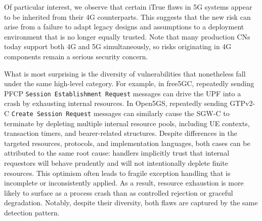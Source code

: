 Of particular interest, we observe that certain iTrue flaws in 5G systems appear to be inherited from their 4G counterparts. This suggests that the new risk can arise from a failure to adapt legacy designs and assumptions to a deployment environment that is no longer equally trusted. Note that many production CNs today support both 4G and 5G simultaneously, so risks originating in 4G components remain a serious security concern. 


What is most surprising is the diversity of vulnerabilities that nonetheless fall under the same high-level category. For example, in free5GC, repeatedly sending PFCP \texttt{Session Establishment Request} messages can drive the UPF into a crash by exhausting internal resources.
In Open5GS, repeatedly sending GTPv2-C \texttt{Create Session Request} messages can similarly cause the SGW-C to terminate by depleting multiple internal resource pools, including UE contexts, transaction timers, and bearer-related structures. Despite differences in the targeted resources, protocols, and implementation languages, both cases can be attributed to the same root cause: handlers implicitly trust that internal requestors will behave prudently and will not intentionally deplete finite resources. This optimism often leads to fragile exception handling that is incomplete or inconsistently applied. As a result, resource exhaustion is more likely to surface as a process crash than as controlled rejection or graceful degradation. Notably, despite their diversity, both flaws are captured by the same detection pattern.





\begin{table}[!t]
  \centering
  \caption{Cross-protocol distribution of vulnerability patterns.}
  \label{tab:pattern_distribution}
\end{table}


